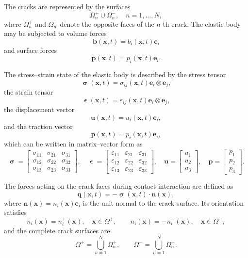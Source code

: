 The cracks are represented by the surfaces
\[
\Omega_n^{+} \cup \Omega_n^{-}, \quad n = 1,\dots,N,
\]
where $\Omega_n^{+}$ and $\Omega_n^{-}$ denote the opposite faces of the $n$-th crack.  
The elastic body may be subjected to volume forces
\[
\mathbf{b}(\mathbf{x},t) = b_i(\mathbf{x},t) \mathbf{e}_i
\]
and surface forces
\[
\mathbf{p}(\mathbf{x},t) = p_i(\mathbf{x},t) \mathbf{e}_i.
\]

The stress–strain state of the elastic body is described by the stress tensor
\[
\boldsymbol{\upsigma}(\mathbf{x},t) = \sigma_{ij}(\mathbf{x},t) \mathbf{e}_i \otimes \mathbf{e}_j,
\]
the strain tensor
\[
\boldsymbol{\upvarepsilon}(\mathbf{x},t) = \varepsilon_{ij}(\mathbf{x},t) \mathbf{e}_i \otimes \mathbf{e}_j,
\]
the displacement vector
\[
\mathbf{u}(\mathbf{x},t) = u_i(\mathbf{x},t) \mathbf{e}_i,
\]
and the traction vector
\[
\mathbf{p}(\mathbf{x},t) = p_i(\mathbf{x},t) \mathbf{e}_i,
\]
which can be written in matrix–vector form as
\begin{equation}\label{GuzZozulyaEq1}
	\bm{\upsigma} =
	\begin{bmatrix}
		\sigma_{11} & \sigma_{21} & \sigma_{31} \\
		\sigma_{12} & \sigma_{22} & \sigma_{32} \\
		\sigma_{13} & \sigma_{23} & \sigma_{33}
	\end{bmatrix},\quad
	\bm{\upvarepsilon} =
	\begin{bmatrix}
		\varepsilon_{11} & \varepsilon_{21} & \varepsilon_{31} \\
		\varepsilon_{12} & \varepsilon_{22} & \varepsilon_{32} \\
		\varepsilon_{13} & \varepsilon_{23} & \varepsilon_{33}
	\end{bmatrix},\quad
	\mathbf{u} =
	\begin{bmatrix} u_1 \\ u_2 \\ u_3 \end{bmatrix},\quad
	\mathbf{p} =
	\begin{bmatrix} p_1 \\ p_2 \\ p_3 \end{bmatrix}.
\end{equation}

The forces acting on the crack faces during contact interaction are defined as
\begin{equation}\label{GuzZozulyaEq2}
	\mathbf{q}(\mathbf{x},t) = -  \bm{\upsigma}(\mathbf{x},t) \!\cdot\! \mathbf{n}(\mathbf{x}),
\end{equation}
where $\mathbf{n}(\mathbf{x}) = n_i(\mathbf{x}) \mathbf{e}_i$ is the unit normal to the crack surface.  
Its orientation satisfies
\[
n_i(\mathbf{x}) = n_i^{+}(\mathbf{x}), \quad \mathbf{x}\in \Omega^+,
\qquad
n_i(\mathbf{x}) = - n_i^{-}(\mathbf{x}), \quad \mathbf{x}\in \Omega^-,
\]
and the complete crack surfaces are
\[
\Omega^+ = \bigcup_{n=1}^{N} \Omega_n^+,
\qquad
\Omega^- = \bigcup_{n=1}^{N} \Omega_n^-.
\]

